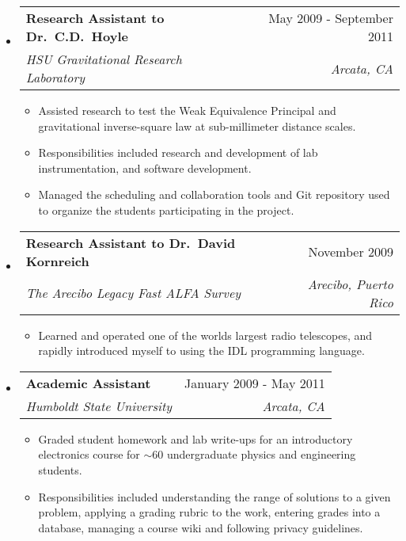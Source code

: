 \documentclass[letterpaper,11pt]{article}
\makeatletter
\newcommand{\resitem}[1]{\item #1 \vspace{-2pt}}
\newcommand{\resheading}[1]{{\large \fcolorbox{black}{mygrey}{\begin{minipage}{\textwidth}{\textbf{#1 \vphantom{p\^{E}}}}\end{minipage}}}}
\newcommand{\ressubheading}[4]{
\begin{tabular*}{7.0in}{l@{\extracolsep{\fill}}r}
		\textbf{#1} & #2 \\
		\textit{#3} & \textit{#4} \\
\end{tabular*}\vspace{-6pt}}
\makeatother
\begin{document}
\begin{itemize}
\item
\ressubheading
{Research Assistant to Dr.\ C\@.D.\ Hoyle}
{May 2009 - September 2011}
{HSU Gravitational Research Laboratory}
{Arcata, CA}
\begin{itemize}
			\resitem{Assisted research to test the Weak Equivalence Principal and gravitational inverse-square law at sub-millimeter distance scales.}
			\resitem{Responsibilities included research and development of lab instrumentation, and software development.}
			\resitem{Managed the scheduling and collaboration tools and Git repository used to organize the students participating in the project.}
		\end{itemize}

	\item
		\ressubheading
        {Research Assistant to Dr.\ David Kornreich}{November 2009}{The Arecibo Legacy Fast ALFA Survey}{Arecibo, Puerto Rico}
		\begin{itemize}
            \resitem{Learned and operated one of the worlds largest radio telescopes, and rapidly introduced myself to using the IDL programming language.}
	\end{itemize}

	\item
		\ressubheading{Academic Assistant}{January 2009 - May 2011}{Humboldt State University}{Arcata, CA}
		\begin{itemize}
			\resitem{Graded student homework and lab write-ups for an introductory electronics course for $\sim$60 undergraduate physics and engineering students.}
			\resitem{Responsibilities included understanding the range of solutions to a given problem, applying a grading rubric to the work, entering grades into a database, managing a course wiki and following privacy guidelines.}
		\end{itemize}

\end{itemize}

\pagebreak[3]
\resheading{Skills}
\end{document}
